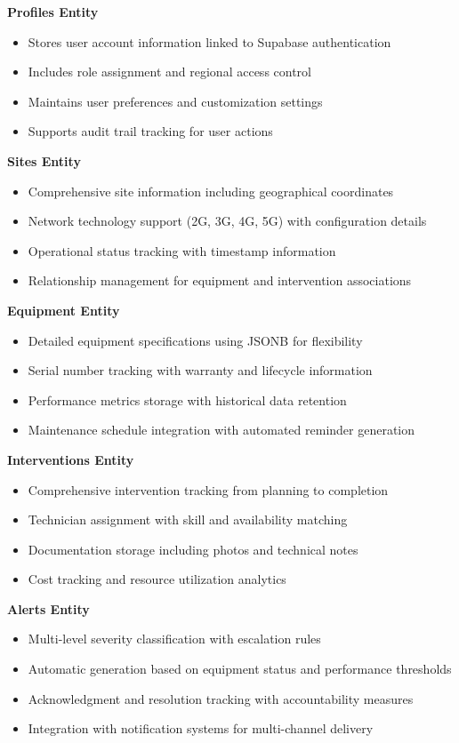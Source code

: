 \textbf{Profiles Entity}
\begin{itemize}
\item Stores user account information linked to Supabase authentication
\item Includes role assignment and regional access control
\item Maintains user preferences and customization settings
\item Supports audit trail tracking for user actions
\end{itemize}

\textbf{Sites Entity}
\begin{itemize}
\item Comprehensive site information including geographical coordinates
\item Network technology support (2G, 3G, 4G, 5G) with configuration details
\item Operational status tracking with timestamp information
\item Relationship management for equipment and intervention associations
\end{itemize}

\textbf{Equipment Entity}
\begin{itemize}
\item Detailed equipment specifications using JSONB for flexibility
\item Serial number tracking with warranty and lifecycle information
\item Performance metrics storage with historical data retention
\item Maintenance schedule integration with automated reminder generation
\end{itemize}

\textbf{Interventions Entity}
\begin{itemize}
\item Comprehensive intervention tracking from planning to completion
\item Technician assignment with skill and availability matching
\item Documentation storage including photos and technical notes
\item Cost tracking and resource utilization analytics
\end{itemize}

\textbf{Alerts Entity}
\begin{itemize}
\item Multi-level severity classification with escalation rules
\item Automatic generation based on equipment status and performance thresholds
\item Acknowledgment and resolution tracking with accountability measures
\item Integration with notification systems for multi-channel delivery
\end{itemize}

